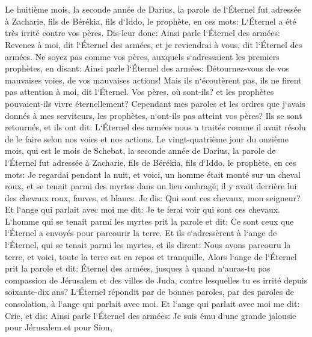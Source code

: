 

\chapter{}

\verse Le huitième mois, la seconde année de Darius, la parole de l`Éternel fut adressée à Zacharie, fils de Bérékia, fils d`Iddo, le prophète, en ces mots: 
\verse L`Éternel a été très irrité contre vos pères. 
\verse Dis-leur donc: Ainsi parle l`Éternel des armées: Revenez à moi, dit l`Éternel des armées, et je reviendrai à vous, dit l`Éternel des armées. 
\verse Ne soyez pas comme vos pères, auxquels s`adressaient les premiers prophètes, en disant: Ainsi parle l`Éternel des armées: Détournez-vous de vos mauvaises voies, de vos mauvaises actions! Mais ils n`écoutèrent pas, ils ne firent pas attention à moi, dit l`Éternel. 
\verse Vos pères, où sont-ils? et les prophètes pouvaient-ils vivre éternellement? 
\verse Cependant mes paroles et les ordres que j`avais donnés à mes serviteurs, les prophètes, n`ont-ils pas atteint vos pères? Ils se sont retournés, et ils ont dit: L`Éternel des armées nous a traités comme il avait résolu de le faire selon nos voies et nos actions. 
\verse Le vingt-quatrième jour du onzième mois, qui est le mois de Schebat, la seconde année de Darius, la parole de l`Éternel fut adressée à Zacharie, fils de Bérékia, fils d`Iddo, le prophète, en ces mots: 
\verse Je regardai pendant la nuit, et voici, un homme était monté sur un cheval roux, et se tenait parmi des myrtes dans un lieu ombragé; il y avait derrière lui des chevaux roux, fauves, et blancs. 
\verse Je dis: Qui sont ces chevaux, mon seigneur? Et l`ange qui parlait avec moi me dit: Je te ferai voir qui sont ces chevaux. 
\verse L`homme qui se tenait parmi les myrtes prit la parole et dit: Ce sont ceux que l`Éternel a envoyés pour parcourir la terre. 
\verse Et ils s`adressèrent à l`ange de l`Éternel, qui se tenait parmi les myrtes, et ils dirent: Nous avons parcouru la terre, et voici, toute la terre est en repos et tranquille. 
\verse Alors l`ange de l`Éternel prit la parole et dit: Éternel des armées, jusques à quand n`auras-tu pas compassion de Jérusalem et des villes de Juda, contre lesquelles tu es irrité depuis soixante-dix ans? 
\verse L`Éternel répondit par de bonnes paroles, par des paroles de consolation, à l`ange qui parlait avec moi. 
\verse Et l`ange qui parlait avec moi me dit: Crie, et dis: Ainsi parle l`Éternel des armées: Je suis ému d`une grande jalousie pour Jérusalem et pour Sion, 
